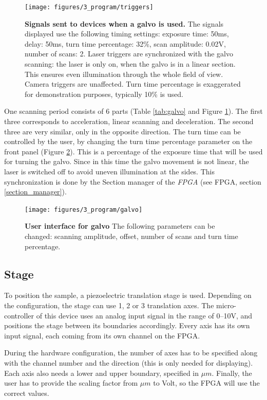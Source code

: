 \documentclass{diploma_style}
\begin{document}
\begin{figure}[phtb]
	\centering
	\texttt{[image: figures/3\_program/triggers]}
	\caption{\textbf{Signals sent to devices when a galvo is used.} The signals displayed use the following timing settings: exposure time: 50ms, delay: 50ms, turn time percentage: 32\%, scan amplitude: 0.02V, number of scans: 2. Laser triggers are synchronized with the galvo scanning: the laser is only on, when the galvo is in a linear section. This ensures even illumination through the whole field of view. Camera triggers are unaffected. Turn time percentage is exaggerated for demonstration purposes, typically  10\% is used.}
	\label{fig:triggers_galvo}
\end{figure}

One scanning period consists of 6 parts (Table \ref{tab:galvo} and Figure \ref{fig:triggers_galvo}). The first three corresponds to acceleration, linear scanning and deceleration. The second three are very similar, only in the opposite direction. The turn time can be controlled by the user, by changing the turn time percentage parameter on the front panel (Figure \ref{fig:ui_galvo}). This is a percentage of the exposure time that will be used for turning the galvo. Since in this time the galvo movement is not linear, the laser is switched off to avoid uneven illumination at the sides. This synchronization is done by the Section manager of the \emph{FPGA} (see FPGA, section \ref{section_manager}).

\begin{figure}[htbp]
	\centering
	\texttt{[image: figures/3\_program/galvo]}
	\caption{\textbf{User interface for galvo} The following parameters can be changed: scanning amplitude, offset, number of scans and turn time percentage.}
	\label{fig:ui_galvo}
\end{figure}

\subsection{Stage}
To position the sample, a piezoelectric translation stage is used. Depending on the configuration, the stage can use 1, 2 or 3 translation axes. The micro-controller of this device uses an analog input signal in the range of 0--10V, and positions the stage between its boundaries accordingly. Every axis has its own input signal, each coming from its own channel on the FPGA.

During the hardware configuration, the number of axes has to be specified along with the channel number and the direction (this is only needed for displaying). Each axis also needs a lower and upper boundary, specified in $\mu m$. Finally, the user has to provide the scaling factor from $\mu m$ to Volt, so the FPGA will use the correct values.
\end{document}
